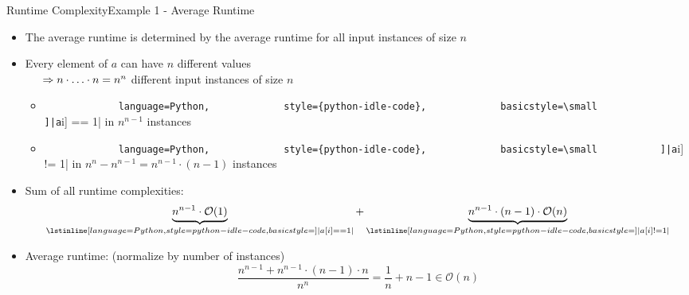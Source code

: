 
\begin{frame}{Runtime Complexity}{Example 1 - Average Runtime}
  \begin{itemize}
    \item
      The {\color{Mittel-Blau}average runtime} is determined by the average
      runtime for all input instances of size $n$
    \item<2->
      Every element of $a$ can have $n$ different values\\
      \begin{math}
        \hspace{1.5em}\Rightarrow n \cdot \ldots \cdot n = n^n
      \end{math}
      different input instances of size $n$
      \begin{itemize}
        \item<3->
          \lstinline[
            language=Python,
            style={python-idle-code},
            basicstyle=\small
            ]|a[i] == 1|
          in $n^{n-1}$ instances
        \item<4->
          \lstinline[
            language=Python,
            style={python-idle-code},
            basicstyle=\small
          ]|a[i] != 1|
          in $n^n - n^{n-1} = n^{n-1} \cdot (n-1)$ instances
      \end{itemize}
    \item<5->
      Sum of all runtime complexities:
      \begin{displaymath}
        \underbrace{n^{n-1} \cdot \mathcal{O}(1)\vphantom{()}}_{
          \lstinline[
            language=Python,
            style={python-idle-code},
            basicstyle=\small
          ]|a[i] == 1|
        } + \underbrace{n^{n-1} \cdot (n-1) \cdot \mathcal{O}(n)}_{
          \lstinline[
            language=Python,
            style={python-idle-code},
            basicstyle=\small
          ]|a[i] != 1|
        }
      \end{displaymath}
    \item<6->
      {\color{Mittel-Blau}Average runtime}: {\footnotesize (normalize by
      number of instances)}
      \begin{displaymath}
        \frac{n^{n-1} + n^{n-1} \cdot (n-1) \cdot n}{n^n}
        = \frac{1}{n} + n - 1
        \in \mathcal{O}(n)
      \end{displaymath}
  \end{itemize}
\end{frame}


